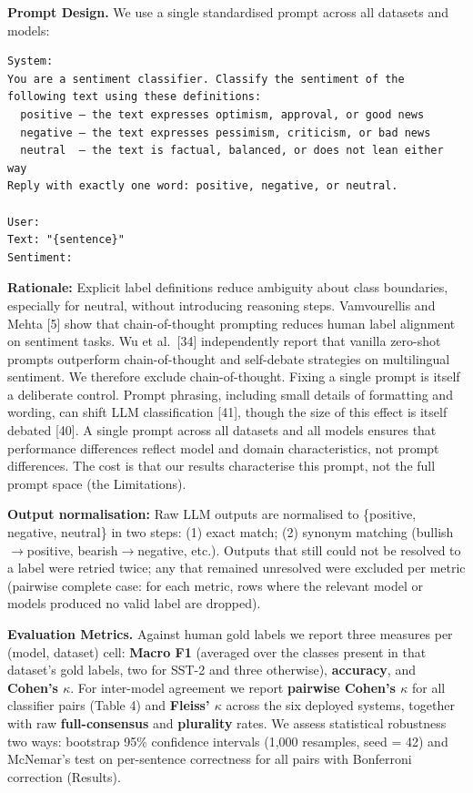\documentclass[11pt]{article}
\begin{document}
\textbf{Prompt Design.} We use a single standardised prompt across all
datasets and models:

\begin{verbatim}
System:
You are a sentiment classifier. Classify the sentiment of the
following text using these definitions:
  positive — the text expresses optimism, approval, or good news
  negative — the text expresses pessimism, criticism, or bad news
  neutral  — the text is factual, balanced, or does not lean either way
Reply with exactly one word: positive, negative, or neutral.

User:
Text: "{sentence}"
Sentiment:
\end{verbatim}

\textbf{Rationale:} Explicit label definitions reduce ambiguity about
class boundaries, especially for neutral, without introducing reasoning
steps. Vamvourellis and Mehta {[}5{]} show that chain-of-thought
prompting reduces human label alignment on sentiment tasks. Wu et
al.~{[}34{]} independently report that vanilla zero-shot prompts
outperform chain-of-thought and self-debate strategies on multilingual
sentiment. We therefore exclude chain-of-thought. Fixing a single prompt
is itself a deliberate control. Prompt phrasing, including small details
of formatting and wording, can shift LLM classification {[}41{]}, though
the size of this effect is itself debated {[}40{]}. A single prompt
across all datasets and all models ensures that performance differences
reflect model and domain characteristics, not prompt differences. The
cost is that our results characterise this prompt, not the full prompt
space (the Limitations).

\textbf{Output normalisation:} Raw LLM outputs are normalised to
\{positive, negative, neutral\} in two steps: (1) exact match; (2)
synonym matching (bullish$\rightarrow$positive, bearish$\rightarrow$negative, etc.). Outputs
that still could not be resolved to a label were retried twice; any that
remained unresolved were excluded per metric (pairwise complete case:
for each metric, rows where the relevant model or models produced no
valid label are dropped).

\textbf{Evaluation Metrics.} Against human gold labels we report three
measures per (model, dataset) cell: \textbf{Macro F1} (averaged over the
classes present in that dataset's gold labels, two for SST-2 and three
otherwise), \textbf{accuracy}, and \textbf{Cohen's $\kappa$}. For inter-model
agreement we report \textbf{pairwise Cohen's $\kappa$} for all classifier pairs
(Table 4) and \textbf{Fleiss' $\kappa$} across the six deployed systems,
together with raw \textbf{full-consensus} and \textbf{plurality} rates.
We assess statistical robustness two ways: bootstrap 95\% confidence
intervals (1,000 resamples, seed = 42) and McNemar's test on
per-sentence correctness for all pairs with Bonferroni correction
(Results).
\end{document}
